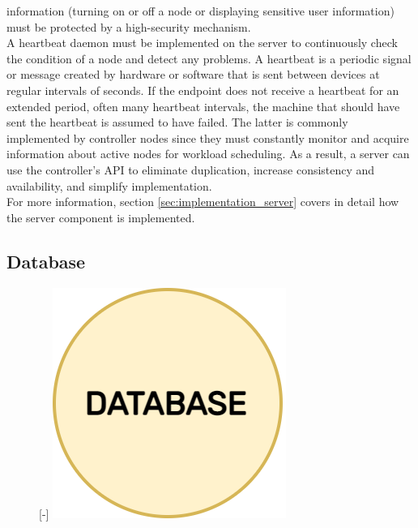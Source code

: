 information (turning on or off a node or displaying sensitive user information)
must be protected by a high-security mechanism. \\ %
A heartbeat daemon must be implemented on the server to continuously check the
condition of a node and detect any problems. A heartbeat is a periodic signal or
message created by hardware or software that is sent between devices at regular intervals
of seconds. If the endpoint does not receive a heartbeat for an extended period,
often many heartbeat intervals, the machine that should have sent the heartbeat
is assumed to have failed\cite{heartbeat}. The latter is commonly implemented by
controller nodes since they must constantly monitor and acquire information
about active nodes for workload scheduling. As a result, a server can use the
controller's API to eliminate duplication, increase consistency and availability,
and simplify implementation. \\ %
For more information, section \ref{sec:implementation_server} covers in detail how
the server component is implemented.

\subsection{Database}
\label{subsec:architecture_components_server_database}

\begin{figure} %
  \raisebox{0pt}[\dimexpr\height-\baselineskip\relax]{\centering
  \includegraphics[width=.2\textwidth]{images/recluster/database.png}}
\end{figure}

